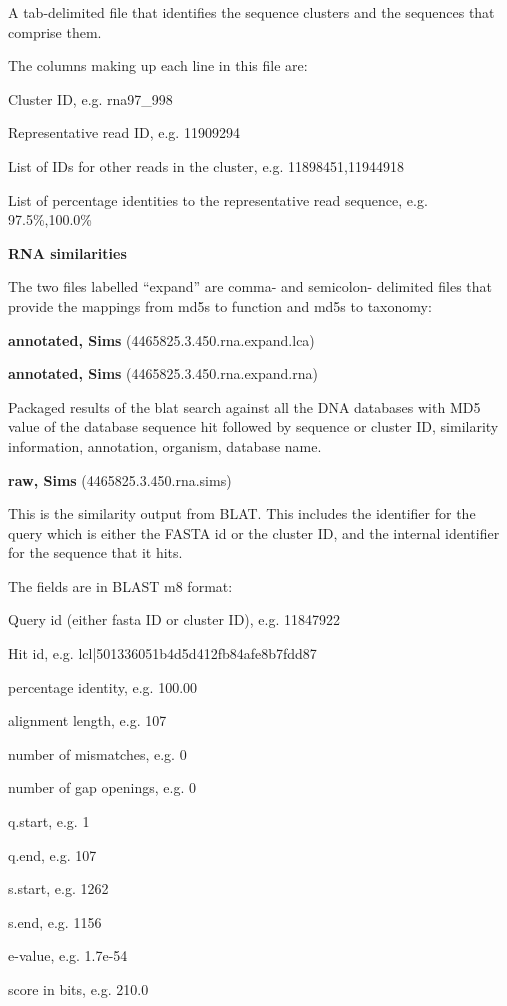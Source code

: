 \documentclass[12pt,fullpage]{report}
\begin{document}
\begin{appendices}
\begin{mdframed}
A tab-delimited file that identifies the sequence clusters and the sequences that comprise them.

The columns making up each line in this file are:

    Cluster ID, e.g. rna97\_998

    Representative read ID, e.g. 11909294

    List of IDs for other reads in the cluster, e.g. 11898451,11944918

    List of percentage identities to the representative read sequence, e.g. 97.5\%,100.0\%

\textbf{RNA similarities}

The two files labelled ``expand'' are comma- and semicolon- delimited files that provide the mappings from md5s to function and md5s to taxonomy:

\textbf{annotated, Sims} (4465825.3.450.rna.expand.lca)

\textbf{annotated, Sims} (4465825.3.450.rna.expand.rna)

Packaged results of the blat search against all the DNA databases with \gls{MD5} value of the database sequence hit followed by sequence or cluster ID, similarity information, annotation, organism, database name.

\textbf{raw, Sims} (4465825.3.450.rna.sims)

This is the similarity output from BLAT. This includes the identifier for the query which is either the FASTA id or the cluster ID, and the internal identifier for the sequence that it hits.

The fields are in BLAST m8 format:

    Query id (either fasta ID or cluster ID), e.g. 11847922

    Hit id, e.g. lcl|501336051b4d5d412fb84afe8b7fdd87

    percentage identity, e.g. 100.00

    alignment length, e.g. 107

    number of mismatches, e.g. 0

    number of gap openings, e.g. 0

    q.start, e.g. 1

    q.end, e.g. 107

    s.start, e.g. 1262

    s.end, e.g. 1156

    e-value, e.g. 1.7e-54

    score in bits, e.g. 210.0


\end{mdframed}
\end{appendices}
\end{document}
